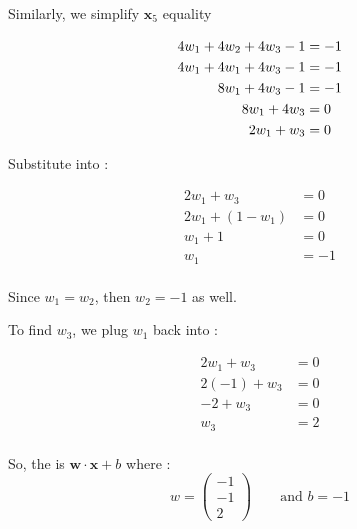 Similarly, we simplify $\mathbf{x}_5$ equality

\begin{align}
    4 w_1 + 4 w_2 + 4 w_3 -1 &= -1 \notag \\
    4 w_1 + 4 w_1 + 4 w_3 -1 &= -1 \notag \\
    8 w_1 + 4 w_3 -1 &= -1 \notag \\
    8 w_1 + 4 w_3 &= 0 \notag \\
    2 w_1 + w_3 &= 0
\label{eq:svmex2}
\end{align}

Substitute  into :

\begin{align*}
  2 w_1 + w_3 &= 0  \\
  2 w_1 + (1 - w_1) &= 0  \\
    w_1 + 1 &= 0  \\
    w_1 &= -1  \\
\end{align*}

Since $w_1=w_2$, then $w_2 = -1$ as well. 

To find $w_3$, we plug $w_1$ back into :

\begin{align*}
    2 w_1 + w_3 &= 0 \\
    2 (-1) + w_3 &= 0 \\
    -2 + w_3 &= 0 \\
    w_3 &= 2 \\
\end{align*}

So, the  is $\mathbf{w} \cdot \mathbf{x} + b$ where :
\[
w = \begin{pmatrix}
    -1 \\
    -1 \\ 
    2
\end{pmatrix} \qquad \text{and } b = -1
\]

\noindent{}